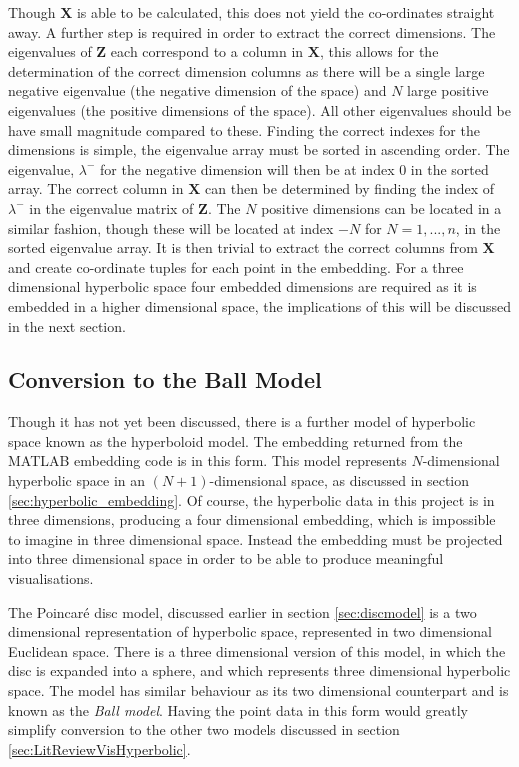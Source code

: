 Though $\boldsymbol{X}$ is able to be calculated, this does not yield the co-ordinates straight away. A further step is required in order to extract the correct dimensions. The eigenvalues of $\boldsymbol{Z}$ each correspond to a column in $\boldsymbol{X}$, this allows for the determination of the correct dimension columns as there will be a single large negative eigenvalue (the negative dimension of the space) and $N$ large positive eigenvalues (the positive dimensions of the space). All other eigenvalues should be have small magnitude compared to these. Finding the correct indexes for the dimensions is simple, the eigenvalue array must be sorted in ascending order. The eigenvalue, $\lambda^-$ for the negative dimension will then be at index 0 in the sorted array. The correct column in $\boldsymbol{X}$ can then be determined by finding the index of $\lambda^-$ in the eigenvalue matrix of $\boldsymbol{Z}$. The $N$ positive dimensions can be located in a similar fashion, though these will be located at index $-N$ for $N=1,...,n$, in the sorted eigenvalue array. It is then trivial to extract the correct columns from $\boldsymbol{X}$ and create co-ordinate tuples for each point in the embedding. For a three dimensional hyperbolic space four embedded dimensions are required as it is embedded in a higher dimensional space, the implications of this will be discussed in the next section.

\subsection{Conversion to the Ball Model}

Though it has not yet been discussed, there is a further model of hyperbolic space known as the hyperboloid model. The embedding returned from the MATLAB embedding code is in this form. This model represents $N$-dimensional hyperbolic space in an $(N+1)$-dimensional space, as discussed in section \ref{sec:hyperbolic_embedding}. Of course, the hyperbolic data in this project is in three dimensions, producing a four dimensional embedding, which is impossible to imagine in three dimensional space. Instead the embedding must be projected into three dimensional space in order to be able to produce meaningful visualisations. 

The Poincar\'{e} disc model, discussed earlier in section \ref{sec:discmodel} is a two dimensional representation of hyperbolic space, represented in two dimensional Euclidean space. There is a three dimensional version of this model, in which the disc is expanded into a sphere, and which represents three dimensional hyperbolic space. The model has similar behaviour as its two dimensional counterpart and is known as the \textit{Ball model}. Having the point data in this form would greatly simplify conversion to the other two models discussed in section \ref{sec:LitReviewVisHyperbolic}. 

